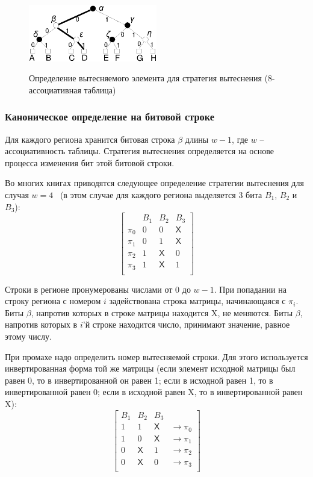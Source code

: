 \begin{figure}[h] \center
  \includegraphics[width=0.5\textwidth]{2.theor/plrumiss}\\
  \caption{Определение вытесняемого элемента для стратегия вытеснения
  \PseudoLRU (8-ассоциативная таблица)}\label{pseudo_lru_miss}
\end{figure}


\subsubsection{Каноническое определение \PseudoLRU на битовой строке}

Для каждого региона хранится битовая строка $\beta$ длины $w{-}1$, где $w$ -- ассоциативность таблицы. Стратегия вытеснения определяется на основе процесса изменения бит этой битовой строки.

Во многих книгах приводятся следующее определение стратегии вытеснения \PseudoLRU для случая
$w=4$~\cite{FundamentalOfComputerOrganizationAndDesign} (в этом случае для каждого региона выделяется 3 бита $B_1$, $B_2$ и $B_3$):
$$ \left[
  \begin{array}{c|ccc}
          & B_1 & B_2 & B_3 \\ \hline
    \pi_0 & 0 & 0 & \textsf{X} \\
    \pi_1 & 0 & 1 & \textsf{X} \\
    \pi_2 & 1 & \textsf{X} & 0 \\
    \pi_3 & 1 & \textsf{X} & 1 \\
  \end{array}
\right]
$$

Строки в регионе пронумерованы числами от 0 до $w{-}1$. При попадании на строку
региона с номером $i$ задействована строка матрицы, начинающаяся с $\pi_i$. Биты
$\beta$, напротив которых в строке матрицы находится \textsf{X}, не меняются.
Биты $\beta$, напротив которых в $i$'й строке находится число, принимают
значение, равное этому числу.

При промахе надо определить номер вытесняемой строки. Для этого используется
инвертированная форма той же матрицы (если элемент исходной матрицы был равен 0, то в инвертированной он равен 1; если в исходной равен 1, то в инвертированной равен 0; если в исходной равен \textsf{X}, то в инвертированной равен \textsf{X}):
$$
\left[
  \begin{array}{ccc|c}
    B_1 & B_2 & B_3 & \\ \hline
    1 & 1 & \textsf{X} & \rightarrow \pi_0 \\
    1 & 0 & \textsf{X} & \rightarrow \pi_1 \\
    0 & \textsf{X} & 1 & \rightarrow \pi_2 \\
    0 & \textsf{X} & 0 & \rightarrow \pi_3 \\
  \end{array}
\right]
$$


